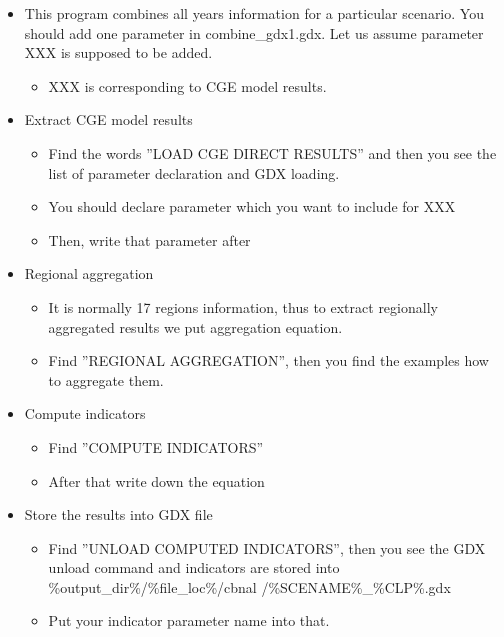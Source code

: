 \documentclass[10pt,a4paper,titlepage,dvipdfmx]{book}
\begin{document}
\begin{itemize}
\begin{itemize}
\item This program combines all years information for a particular scenario. You should add one parameter in combine\_gdx1.gdx. Let us assume parameter XXX is supposed to be added.
\begin{itemize}
\item XXX is corresponding to CGE model results. 
\end{itemize}

\item Extract CGE model results 
\begin{itemize}
\item Find the words ''LOAD CGE DIRECT RESULTS'' and then you see the list of parameter declaration and GDX loading.
\item You should declare parameter which you want to include for XXX
\item Then, write that parameter after 
\end{itemize}

\item Regional aggregation
\begin{itemize}
\item It is normally 17 regions information, thus to extract regionally aggregated results we put aggregation equation.
\item Find ''REGIONAL AGGREGATION'', then you find the examples how to aggregate them.
\end{itemize}

\item Compute indicators
\begin{itemize}
\item Find ''COMPUTE INDICATORS''
\item After that write down the equation
\end{itemize}

\item Store the results into GDX file
\begin{itemize}
\item Find ''UNLOAD COMPUTED INDICATORS'', then you see the GDX unload command and indicators are stored into \%output\_dir\%/\%file\_loc\%/cbnal /\%SCENAME\%\_\%CLP\%.gdx
\item Put your indicator parameter name into that.
\end{itemize}

\end{itemize}

\end{itemize}
\end{document}
